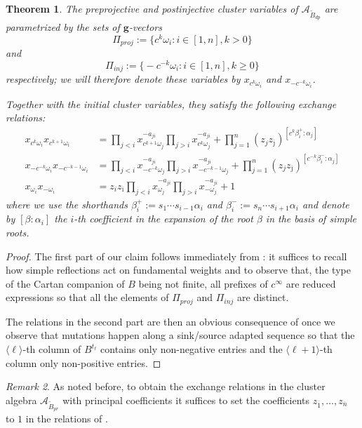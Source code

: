 \documentclass[12pt]{amsart}
\newcommand{\cA}{\mathcal{A}}
\newcommand{\bfg}{\mathbf{g}}
\renewcommand{\mod}[1]{\langle {#1} \rangle}
\newcommand{\ol}[1]{\overline{#1}}
\newcommand{\Bpr}{\widetilde{B}_{pr}}
\newcommand{\Bdp}{\widetilde{B}_{dp}}
\newcommand{\Zidx}{\ell}
\newcommand{\cvar}{z}
\newtheorem{theorem}{Theorem}[section]
\theoremstyle{remark}
\newtheorem{remark}[theorem]{Remark}
\numberwithin{equation}{section}
\numberwithin{figure}{section}
\begin{document}
\begin{theorem}
  \label{thm:vars_and_rels_in_bipartite_belt}
  The preprojective and postinjective cluster variables of $\cA_{\Bdp}$ are parametrized by the sets of $\bfg$-vectors
  \[
    \Pi_{\textit{proj}}:=\big\{c^k\omega_i: i \in [1,n], k>0\big\}
  \]
  and
  \[
    \Pi_{\textit{inj}}:=\big\{-c^{-k}\omega_i: i \in [1,n], k\geq0 \big\}
  \]
  respectively; we will therefore denote these variables by $x_{c^k\omega_i}$ and $x_{-c^{-k}\omega_i}$.

  Together with the initial cluster variables, they satisfy the following exchange relations:
  \begin{align}
    x_{c^k\omega_i}x_{c^{k+1}\omega_i} 
    &= 
    \prod_{j<i} x_{c^{k+1}\omega_j}^{-a_{ji}}
    \prod_{j>i} x_{c^k\omega_j}^{-a_{ji}}
    +
    \prod_{j=1}^n (z_j z_{\ol{\jmath}})^{[c^k\beta_i^+:\alpha_j]}\label{eq:preprojective}
    \\
    x_{-c^{-k}\omega_i}x_{-c^{-k-1}\omega_i} 
    &= 
    \prod_{j<i} x_{-c^{-k}\omega_j}^{-a_{ji}}
    \prod_{j>i} x_{-c^{-k-1}\omega_j}^{-a_{ji}}
    +
    \prod_{j=1}^n (z_j z_{\ol{\jmath}})^{[c^{-k}\beta_i^-:\alpha_j]}\label{eq:postinjective}
    \\
    x_{\omega_i}x_{-\omega_i}
    &=
    z_iz_{\ol{\imath}}
    \prod_{j<i} x_{\omega_j}^{-a_{ji}}
    \prod_{j>i} x_{-\omega_j}^{-a_{ji}}
    +
    1\label{eq:plusminus}
  \end{align}
  where we use the shorthands $\beta_i^+:=s_1\cdots s_{i-1}\alpha_i$ and $\beta_i^-:=s_n\cdots s_{i+1}\alpha_i$ and denote by $[\beta:\alpha_i]$ the $i$-th coefficient in the expansion of the root $\beta$ in the basis of simple roots.
\end{theorem}
\begin{proof}
  The first part of our claim follows immediately from : it suffices to recall how simple reflections act on fundamental weights and to observe that, the type of the Cartan companion of $B$ being not finite, all prefixes of $c^\infty$ are reduced expressions so that all the elements of $\Pi_{\textit{proj}}$ and $\Pi_{\textit{inj}}$ are distinct.

  The relations in the second part are then an obvious consequence of  once we observe that mutations happen along a sink/source adapted sequence so that the $\mod{\Zidx}$-th column of $B^{t_\Zidx}$ contains only non-negative entries and the $\mod{\Zidx+1}$-th column only non-positive entries.
\end{proof}
\begin{remark}
  As noted before, to obtain the exchange relations in the cluster algebra $\cA_{\Bpr}$ with principal coefficients it suffices to set the coefficients $\cvar_{\ol{1}},\dotsc,\cvar_{\ol{n}}$ to $1$ in the relations of .
\end{remark}
\end{document}
